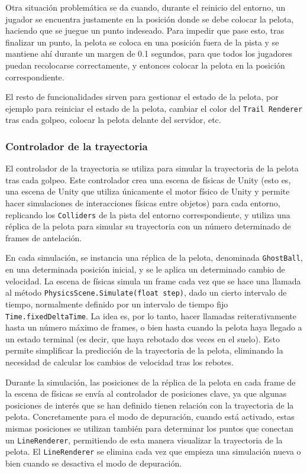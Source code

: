 Otra situación problemática se da cuando, durante el reinicio del entorno, un jugador se encuentra justamente en la posición donde se debe colocar la pelota, haciendo que se juegue un punto indeseado. Para impedir que pase esto, tras finalizar un punto, la pelota se coloca en una posición fuera de la pista y se mantiene ahí durante un margen de 0.1 segundos, para que todos los jugadores puedan recolocarse correctamente, y entonces colocar la pelota en la posición correspondiente.

El resto de funcionalidades sirven para gestionar el estado de la pelota, por ejemplo para reiniciar el estado de la pelota, cambiar el color del \texttt{Trail Renderer} tras cada golpeo, colocar la pelota delante del servidor, etc.

\subsubsection{Controlador de la trayectoria}

El controlador de la trayectoria se utiliza para simular la trayectoria de la pelota tras cada golpeo. Este controlador crea una escena de físicas de Unity (esto es, una escena de Unity que utiliza únicamente el motor físico de Unity y permite hacer simulaciones de interacciones físicas entre objetos) para cada entorno, replicando los \texttt{Colliders} de la pista del entorno correspondiente, y utiliza una réplica de la pelota para simular su trayectoria con un número determinado de frames de antelación.

En cada simulación, se instancia una réplica de la pelota, denominada \texttt{GhostBall}, en una determinada posición inicial, y se le aplica un determinado cambio de velocidad. La escena de físicas simula un frame cada vez que se hace una llamada al método \texttt{PhysicsScene.Simulate(float step)}, dado un cierto intervalo de tiempo, normalmente definido por un intervalo de tiempo fijo \texttt{Time.fixedDeltaTime}. La idea es, por lo tanto, hacer llamadas reiterativamente hasta un número máximo de frames, o bien hasta cuando la pelota haya llegado a un estado terminal (es decir, que haya rebotado dos veces en el suelo). Esto permite simplificar la predicción de la trayectoria de la pelota, eliminando la necesidad de calcular los cambios de velocidad tras los rebotes.

Durante la simulación, las posiciones de la réplica de la pelota en cada frame de la escena de físicas se envía al controlador de posiciones clave, ya que algunas posiciones de interés que se han definido tienen relación con la trayectoria de la pelota. Concretamente para el modo de depuración, cuando está activado, estas mismas posiciones se utilizan también para determinar los puntos que conectan un \texttt{LineRenderer}, permitiendo de esta manera visualizar la trayectoria de la pelota. El \texttt{LineRenderer} se elimina cada vez que empieza una simulación nueva o bien cuando se desactiva el modo de depuración.

